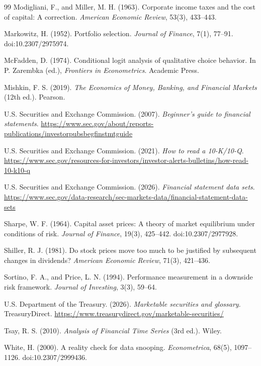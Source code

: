 \documentclass[11pt,oneside,openany]{book}
\begin{document}
\begin{thebibliography}{99}
Modigliani, F., and Miller, M. H. (1963). Corporate income taxes and the cost of capital: A correction. \textit{American Economic Review}, 53(3), 433--443.

Markowitz, H. (1952). Portfolio selection. \textit{Journal of Finance}, 7(1), 77--91. doi:10.2307/2975974.

McFadden, D. (1974). Conditional logit analysis of qualitative choice behavior. In P. Zarembka (ed.), \textit{Frontiers in Econometrics}. Academic Press.

Mishkin, F. S. (2019). \textit{The Economics of Money, Banking, and Financial Markets} (12th ed.). Pearson.

U.S. Securities and Exchange Commission. (2007). \textit{Beginner's guide to financial statements}. \url{https://www.sec.gov/about/reports-publications/investorpubsbegfinstmtguide}

U.S. Securities and Exchange Commission. (2021). \textit{How to read a 10-K/10-Q}. \url{https://www.sec.gov/resources-for-investors/investor-alerts-bulletins/how-read-10-k10-q}

U.S. Securities and Exchange Commission. (2026). \textit{Financial statement data sets}. \url{https://www.sec.gov/data-research/sec-markets-data/financial-statement-data-sets}

Sharpe, W. F. (1964). Capital asset prices: A theory of market equilibrium under conditions of risk. \textit{Journal of Finance}, 19(3), 425--442. doi:10.2307/2977928.

Shiller, R. J. (1981). Do stock prices move too much to be justified by subsequent changes in dividends? \textit{American Economic Review}, 71(3), 421--436.

Sortino, F. A., and Price, L. N. (1994). Performance measurement in a downside risk framework. \textit{Journal of Investing}, 3(3), 59--64.

U.S. Department of the Treasury. (2026). \textit{Marketable securities and glossary}. TreasuryDirect. \url{https://www.treasurydirect.gov/marketable-securities/}

Tsay, R. S. (2010). \textit{Analysis of Financial Time Series} (3rd ed.). Wiley.

White, H. (2000). A reality check for data snooping. \textit{Econometrica}, 68(5), 1097--1126. doi:10.2307/2999436.

\end{thebibliography}

\printindex
\end{document}
